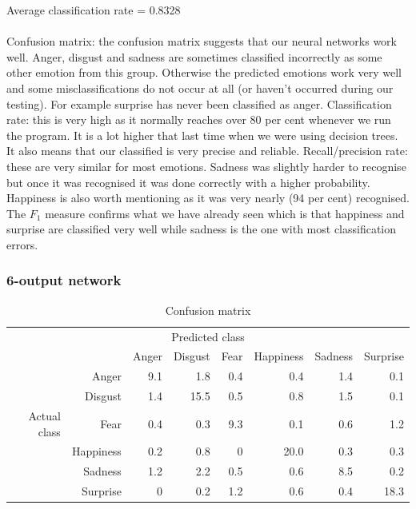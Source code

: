 \documentclass[12pt]{article}
\begin{document}
Average classification rate = 0.8328 \\ \\

Confusion matrix: the confusion matrix suggests that our neural networks work well. Anger, disgust and sadness are sometimes classified incorrectly as some other emotion from this group. Otherwise the predicted emotions work very well and some misclassifications do not occur at all (or haven't occurred during our testing). For example surprise has never been classified as anger. Classification rate: this is very high as it normally reaches over 80 per cent whenever we run the program. It is a lot higher that last time when we were using decision trees. It also means that our classified is very precise and reliable. Recall/precision rate: these are very similar for most emotions. Sadness was slightly harder to recognise but once it was recognised it was done correctly with a higher probability. Happiness is also worth mentioning as it was very nearly (94 per cent) recognised. The $F_1$ measure confirms what we have already seen which is that happiness and surprise are classified very well while sadness is the one with most classification errors.


\subsubsection*{6-output network}

\begin{table}
\centering
\begin{tabular}{r r | r r r r r r}
\multicolumn{8}{c}{Predicted class} \\
&  & Anger & Disgust & Fear & Happiness & Sadness & Surprise \\
\hline
 & Anger            & 9.1 & 1.8  & 0.4 & 0.4  & 1.4 & 0.1  \\
 & Disgust          & 1.4 & 15.5 & 0.5 & 0.8  & 1.5 & 0.1  \\
Actual class & Fear & 0.4 & 0.3  & 9.3 & 0.1  & 0.6 & 1.2  \\
 & Happiness        & 0.2 & 0.8  & 0   & 20.0 & 0.3 & 0.3  \\
 & Sadness          & 1.2 & 2.2  & 0.5 & 0.6  & 8.5 & 0.2  \\
 & Surprise         & 0   & 0.2  & 1.2 & 0.6  & 0.4 & 18.3 \\
\end{tabular}
\caption{Confusion matrix}
\end{table}
\end{document}
